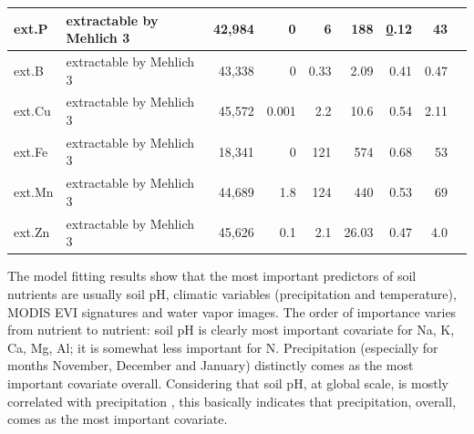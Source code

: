 \begin{linenumbers}
\begin{table}
{\begin{tabular}{m{}m{}rrrrrrm{}}
\midrule
ext.\@ P   & extractable by Mehlich 3  & 42,984 & 0 & 6 & 188          & {\ul 0.12}              & 43    \\ %
\midrule
ext.\@ B        & extractable by Mehlich 3          & 43,338 & 0 & 0.33 & 2.09               &  0.41           & 0.47  \\
\midrule
ext.\@ Cu       & extractable by Mehlich 3          & 45,572 & 0.001 & 2.2 & 10.6            & 0.54              & 2.11     \\
\midrule
ext.\@ Fe       & extractable by Mehlich 3          & 18,341 & 0 & 121 & 574                 & 0.68              & 53    \\
\midrule
ext.\@ Mn       & extractable by Mehlich 3          & 44,689 & 1.8 & 124 & 440               & 0.53              & 69     \\
\midrule
ext.\@ Zn       & extractable by Mehlich 3          & 45,626 & 0.1 & 2.1 & 26.03             & 0.47              & 4.0    \\
\bottomrule
\end{tabular}
}
\end{table}

The model fitting results show that the most important predictors of soil nutrients are usually soil pH, climatic variables (precipitation and temperature), MODIS EVI signatures and water vapor images. The order of importance varies from nutrient to nutrient: soil pH is clearly most important covariate for Na, K, Ca, Mg, Al; it is somewhat less important for N. Precipitation (especially for months November, December and January) distinctly comes as the most important covariate overall. Considering that soil pH, at global scale, is mostly correlated with precipitation \citep{Hengl2016SoilGrids250}, this basically indicates that precipitation, overall, comes as the most important covariate. \par


\end{linenumbers}
